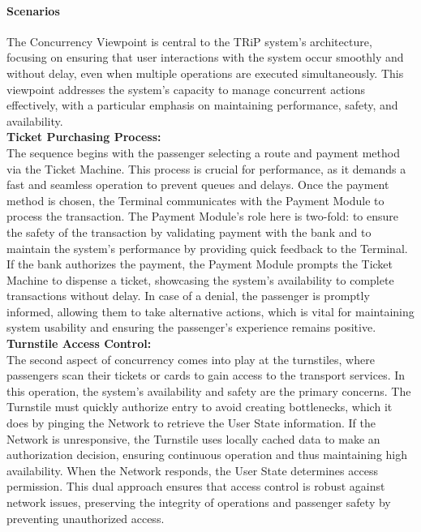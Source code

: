 \paragraph{Scenarios}


The Concurrency Viewpoint is central to the TRiP system's architecture, focusing on ensuring that user interactions with the system occur smoothly and without delay, even when multiple operations are executed simultaneously. This viewpoint addresses the system's capacity to manage concurrent actions effectively, with a particular emphasis on maintaining performance, safety, and availability. \\

\noindent\textbf{Ticket Purchasing Process:} \\
The sequence begins with the passenger selecting a route and payment method via the Ticket Machine. This process is crucial for performance, as it demands a fast and seamless operation to prevent queues and delays. Once the payment method is chosen, the Terminal communicates with the Payment Module to process the transaction. The Payment Module's role here is two-fold: to ensure the safety of the transaction by validating payment with the bank and to maintain the system's performance by providing quick feedback to the Terminal. If the bank authorizes the payment, the Payment Module prompts the Ticket Machine to dispense a ticket, showcasing the system's availability to complete transactions without delay. In case of a denial, the passenger is promptly informed, allowing them to take alternative actions, which is vital for maintaining system usability and ensuring the passenger's experience remains positive. \\

\noindent \textbf{Turnstile Access Control:} \\
The second aspect of concurrency comes into play at the turnstiles, where passengers scan their tickets or cards to gain access to the transport services. In this operation, the system's availability and safety are the primary concerns. The Turnstile must quickly authorize entry to avoid creating bottlenecks, which it does by pinging the Network to retrieve the User State information. If the Network is unresponsive, the Turnstile uses locally cached data to make an authorization decision, ensuring continuous operation and thus maintaining high availability. When the Network responds, the User State determines access permission. This dual approach ensures that access control is robust against network issues, preserving the integrity of operations and passenger safety by preventing unauthorized access. \\


